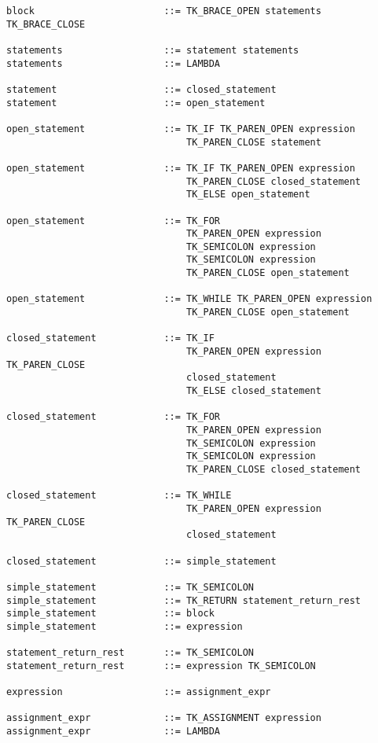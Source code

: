 \documentclass [a4paper,titlepage]{report}
\begin{document}
\begin{verbatim}
block                       ::= TK_BRACE_OPEN statements TK_BRACE_CLOSE

statements                  ::= statement statements
statements                  ::= LAMBDA

statement                   ::= closed_statement
statement                   ::= open_statement

open_statement              ::= TK_IF TK_PAREN_OPEN expression 
                                TK_PAREN_CLOSE statement

open_statement              ::= TK_IF TK_PAREN_OPEN expression 
                                TK_PAREN_CLOSE closed_statement 
                                TK_ELSE open_statement

open_statement              ::= TK_FOR   
                                TK_PAREN_OPEN expression 
                                TK_SEMICOLON expression 
                                TK_SEMICOLON expression 
                                TK_PAREN_CLOSE open_statement

open_statement              ::= TK_WHILE TK_PAREN_OPEN expression 
                                TK_PAREN_CLOSE open_statement

closed_statement            ::= TK_IF 
                                TK_PAREN_OPEN expression TK_PAREN_CLOSE 
                                closed_statement 
                                TK_ELSE closed_statement

closed_statement            ::= TK_FOR 
                                TK_PAREN_OPEN expression 
                                TK_SEMICOLON expression 
                                TK_SEMICOLON expression 
                                TK_PAREN_CLOSE closed_statement

closed_statement            ::= TK_WHILE 
                                TK_PAREN_OPEN expression TK_PAREN_CLOSE 
                                closed_statement

closed_statement            ::= simple_statement

simple_statement            ::= TK_SEMICOLON
simple_statement            ::= TK_RETURN statement_return_rest
simple_statement            ::= block
simple_statement            ::= expression

statement_return_rest       ::= TK_SEMICOLON
statement_return_rest       ::= expression TK_SEMICOLON

expression                  ::= assignment_expr

assignment_expr             ::= TK_ASSIGNMENT expression
assignment_expr             ::= LAMBDA


\end{verbatim}
\end{document}
